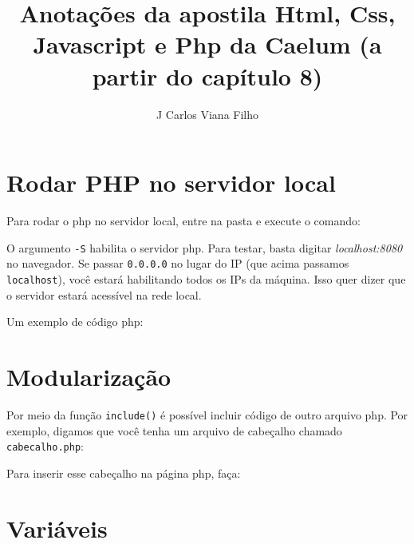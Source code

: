 \documentclass[12pt, a4paper]{article}
\title{Anotações da apostila Html, Css, Javascript e Php da Caelum (a partir do capítulo 8)}
\author{J Carlos Viana Filho}
\date{}
\begin{document}

\makeatletter
\begin{center}
\textsl{\LARGE \@title}
\end{center}

\begin{flushright}
\emph{\@author}
\end{flushright}
\makeatother


\tableofcontents

\newpage


\section{Rodar PHP no servidor local}

Para rodar o php no servidor local, entre na pasta e execute o comando:\\


O argumento \verb|-S| habilita o servidor php. Para testar, basta digitar \textit{localhost:8080} no navegador. Se passar \verb|0.0.0.0| no lugar do IP (que acima passamos \verb|localhost|), você estará habilitando todos os IPs da máquina. Isso quer dizer que o servidor estará acessível na rede local.

Um exemplo de código php:\\


\section{Modularização}

Por meio da função \verb|include()| é possível incluir código de outro arquivo php. Por exemplo, digamos que você tenha um arquivo de cabeçalho chamado \verb|cabecalho.php|:\\


Para inserir esse cabeçalho na página php, faça:\\


\section{Variáveis}
\end{document}
